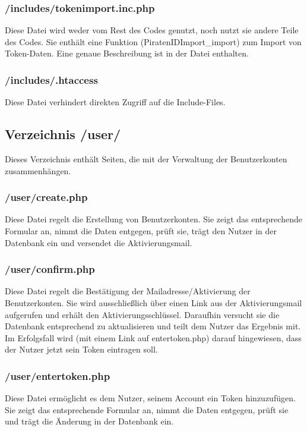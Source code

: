 \subsubsection{/includes/tokenimport.inc.php}
Diese Datei wird weder vom Rest des Codes genutzt, noch nutzt sie andere Teile des Codes.
Sie enthält eine Funktion (PiratenIDImport\_import) zum Import von Token-Daten.
Eine genaue Beschreibung ist in der Datei enthalten.

\subsubsection{/includes/.htaccess}
Diese Datei verhindert direkten Zugriff auf die Include-Files.



\subsection{Verzeichnis /user/}
Dieses Verzeichnis enthält Seiten, die mit der Verwaltung der Benutzerkonten zusammenhängen.

\subsubsection{/user/create.php}
Diese Datei regelt die Erstellung von Benutzerkonten.
Sie zeigt das entsprechende Formular an, nimmt die Daten entgegen, prüft sie, trägt den Nutzer in der Datenbank ein und versendet die Aktivierungsmail.

\subsubsection{/user/confirm.php}
Diese Datei regelt die Bestätigung der Mailadresse/Aktivierung der Benutzerkonten.
Sie wird ausschließlich über einen Link aus der Aktivierungsmail aufgerufen und erhält den Aktivierungsschlüssel.
Daraufhin versucht sie die Datenbank entsprechend zu aktualisieren und teilt dem Nutzer das Ergebnis mit.
Im Erfolgsfall wird (mit einem Link auf entertoken.php) darauf hingewiesen, dass der Nutzer jetzt sein Token eintragen soll.

\subsubsection{/user/entertoken.php}
Diese Datei ermöglicht es dem Nutzer, seinem Account ein Token hinzuzufügen.
Sie zeigt das entsprechende Formular an, nimmt die Daten entgegen, prüft sie und trägt die Änderung in der Datenbank ein.

